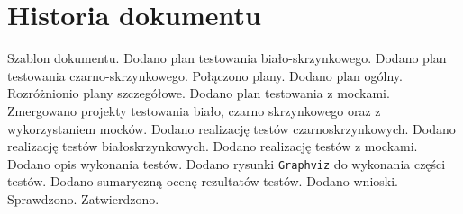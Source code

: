 \documentclass[10pt]{dokument-tiwo}
\begin{document}
\newpage
\section*{Historia dokumentu}
\begin{versions}
        Szablon dokumentu.
        Dodano plan testowania biało-skrzynkowego.
        Dodano plan testowania czarno-skrzynkowego.
        Połączono plany. Dodano plan ogólny. Rozróżnionio plany
        szczegółowe.
        Dodano plan testowania z mockami.
        Zmergowano projekty testowania biało\dywiz, czarno\dywiz
        skrzynkowego oraz z wykorzystaniem mocków.
        Dodano realizację testów czarno\dywiz skrzynkowych.
        Dodano realizację testów biało\dywiz skrzynkowych.
        Dodano realizację testów z mockami.
        Dodano opis wykonania testów.
        Dodano rysunki \texttt{Graphviz} do wykonania części testów.
        Dodano sumaryczną ocenę rezultatów testów. Dodano wnioski.
        Sprawdzono. Zatwierdzono.
\end{versions}
\end{document}
